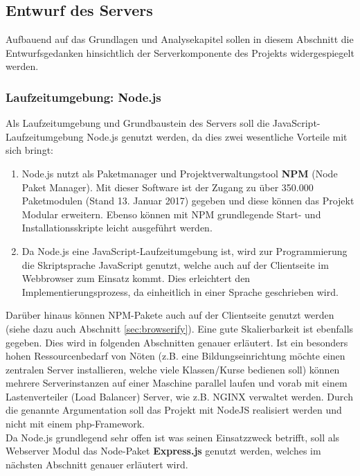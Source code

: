 \subsection{Entwurf des Servers}\label{sec:serverkonzept}
Aufbauend auf das Grundlagen und Analysekapitel sollen in diesem Abschnitt die Entwurfsgedanken hinsichtlich der Serverkomponente des Projekts widergespiegelt werden. 
\subsubsection{Laufzeitumgebung: Node.js}\label{sec:nodejs}
Als Laufzeitumgebung und Grundbaustein des Servers soll die JavaScript-Laufzeitumgebung Node.js genutzt werden, da dies zwei wesentliche Vorteile mit sich bringt:
\begin{enumerate}
	\item Node.js nutzt als Paketmanager und Projektverwaltungstool \textbf{NPM} (Node Paket Manager). Mit dieser Software ist der Zugang zu über 350.000 Paketmodulen (Stand 13. Januar 2017) gegeben und diese können das Projekt Modular erweitern. Ebenso können mit NPM grundlegende Start- und Installationsskripte leicht ausgeführt werden. 
	\item Da Node.js eine JavaScript-Laufzeitumgebung ist, wird zur Programmierung die Skriptsprache JavaScript genutzt, welche auch auf der Clientseite im Webbrowser zum Einsatz kommt. Dies erleichtert den Implementierungsprozess, da einheitlich in einer Sprache geschrieben wird.
\end{enumerate}
Darüber hinaus können NPM-Pakete auch auf der Clientseite genutzt werden (siehe dazu auch Abschnitt \ref{sec:browserify}). Eine gute Skalierbarkeit ist ebenfalls gegeben. Dies wird in folgenden Abschnitten genauer erläutert. Ist ein besonders hohen Ressourcenbedarf von Nöten (z.B. eine Bildungseinrichtung möchte einen zentralen Server installieren, welche viele Klassen/Kurse bedienen soll) können mehrere Serverinstanzen auf einer Maschine parallel laufen und vorab mit einem Lastenverteiler (Load Balancer) Server, wie z.B. NGINX verwaltet werden. Durch die genannte Argumentation soll das Projekt mit NodeJS realisiert werden und nicht mit einem php-Framework. \\ Da Node.js grundlegend sehr offen ist was seinen Einsatzzweck betrifft, soll als Webserver Modul das Node-Paket \textbf{Express.js} genutzt werden, welches im nächsten Abschnitt genauer erläutert wird.
